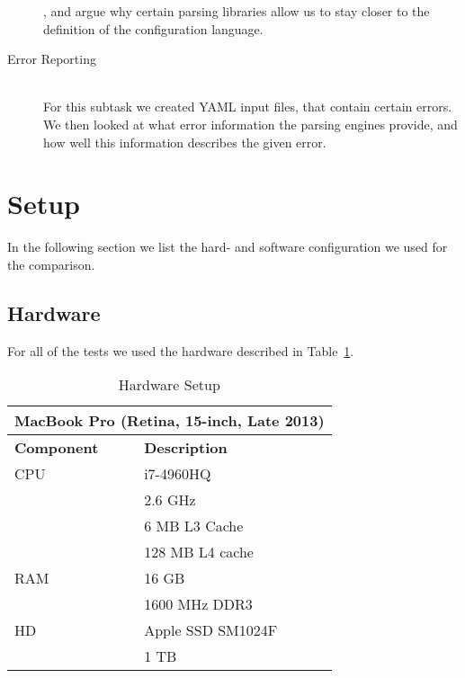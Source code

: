 \begin{description}
  \closeness*

  , and argue why certain parsing libraries allow us to stay closer to the definition of the configuration language.

  \item[Error Reporting]~\\[0.1cm]
  For this subtask we created YAML input files, that contain certain errors. We then looked at what error information the parsing engines provide, and how well this information describes the given error.

\end{description}

\section{Setup}

In the following section we list the hard- and software configuration we used for the comparison.

\subsection{Hardware}

For all of the tests we used the hardware described in Table~\ref{table:benchmark_hardware}.

\begin{table}[H]
  \caption{Hardware Setup}
  \label{table:benchmark_hardware}
  \centering
  \begin{tabular}{ll}
\toprule
\multicolumn{2}{c}{MacBook Pro (Retina, 15-inch, Late 2013)}\\
\midrule
\textbf{Component} & \textbf{Description}\\
\midrule
               CPU &            i7-4960HQ\\
                   &              2.6 GHz\\
                   &        6 MB L3 Cache\\
                   &      128 MB L4 cache\\
               RAM &                16 GB\\
                   &        1600 MHz DDR3\\
                HD &    Apple SSD SM1024F\\
                   &                 1 TB\\
\bottomrule
  \end{tabular}
\end{table}

